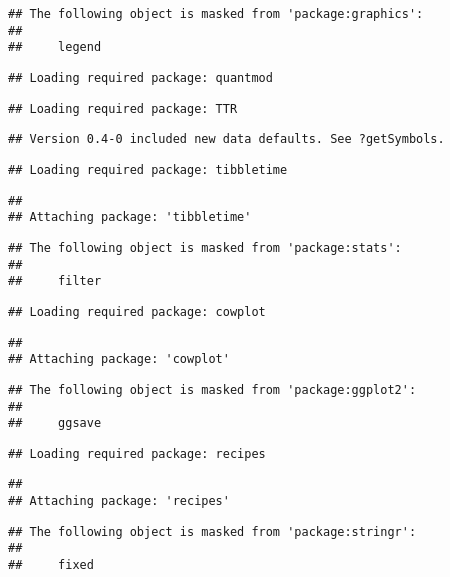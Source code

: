 \documentclass[]{article}
\begin{document}
\begin{verbatim}
## The following object is masked from 'package:graphics':
## 
##     legend
\end{verbatim}

\begin{verbatim}
## Loading required package: quantmod
\end{verbatim}

\begin{verbatim}
## Loading required package: TTR
\end{verbatim}

\begin{verbatim}
## Version 0.4-0 included new data defaults. See ?getSymbols.
\end{verbatim}

\begin{verbatim}
## Loading required package: tibbletime
\end{verbatim}

\begin{verbatim}
## 
## Attaching package: 'tibbletime'
\end{verbatim}

\begin{verbatim}
## The following object is masked from 'package:stats':
## 
##     filter
\end{verbatim}

\begin{verbatim}
## Loading required package: cowplot
\end{verbatim}

\begin{verbatim}
## 
## Attaching package: 'cowplot'
\end{verbatim}

\begin{verbatim}
## The following object is masked from 'package:ggplot2':
## 
##     ggsave
\end{verbatim}

\begin{verbatim}
## Loading required package: recipes
\end{verbatim}

\begin{verbatim}
## 
## Attaching package: 'recipes'
\end{verbatim}

\begin{verbatim}
## The following object is masked from 'package:stringr':
## 
##     fixed
\end{verbatim}
\end{document}
